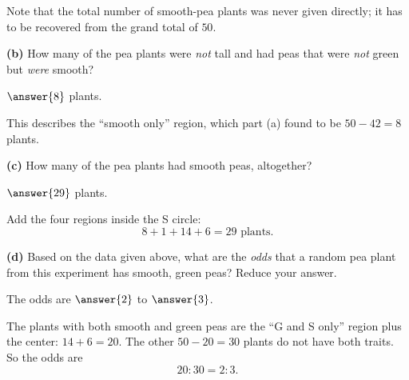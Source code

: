 \documentclass[12pt]{ximera}
\begin{document}
\begin{problem}
\begin{prompt}
\begin{feedback}
Note that the total number of smooth-pea plants was never given directly; it has to
be recovered from the grand total of $50$.
\end{feedback}
\end{prompt}

\begin{prompt}
\textbf{(b)} How many of the pea plants were \emph{not} tall and had peas that were
\emph{not} green but \emph{were} smooth?

$\answer{8}$ plants.

\begin{feedback}
This describes the ``smooth only'' region, which part (a) found to be
$50-42=8$ plants.
\end{feedback}
\end{prompt}

\begin{prompt}
\textbf{(c)} How many of the pea plants had smooth peas, altogether?

$\answer{29}$ plants.

\begin{feedback}
Add the four regions inside the S circle:
\[ 8 + 1 + 14 + 6 = 29 \text{ plants.} \]
\end{feedback}
\end{prompt}

\begin{prompt}
\textbf{(d)} Based on the data given above, what are the \emph{odds} that a random pea
plant from this experiment has smooth, green peas? Reduce your answer.

The odds are $\answer{2}$ to $\answer{3}$.

\begin{feedback}
The plants with both smooth and green peas are the ``G and S only'' region plus the
center: $14+6=20$. The other $50-20=30$ plants do not have both traits. So the odds
are
\[ 20:30 = 2:3. \]
\end{feedback}
\end{prompt}
\end{problem}
\end{document}
